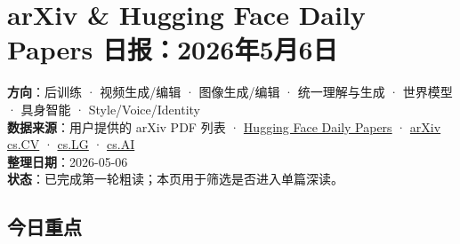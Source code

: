 
\section{arXiv \& Hugging Face Daily Papers 日报：2026年5月6日}

\begin{conceptbox}
\textbf{方向}：后训练 · 视频生成/编辑 · 图像生成/编辑 · 统一理解与生成 · 世界模型 · 具身智能 · Style/Voice/Identity\\
\textbf{数据来源}：用户提供的 arXiv PDF 列表 · \href{https://huggingface.co/papers}{Hugging Face Daily Papers} · \href{https://arxiv.org/list/cs.CV/new}{arXiv cs.CV} · \href{https://arxiv.org/list/cs.LG/new}{cs.LG} · \href{https://arxiv.org/list/cs.AI/new}{cs.AI}\\
\textbf{整理日期}：2026-05-06\\
\textbf{状态}：已完成第一轮粗读；本页用于筛选是否进入单篇深读。
\end{conceptbox}

\subsection{今日重点}

